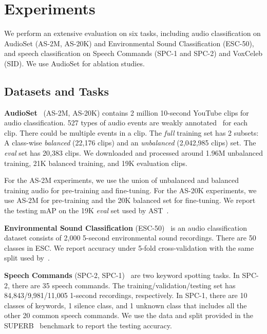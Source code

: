 \documentclass{article}
\begin{document}
\section{Experiments}
We perform an extensive evaluation on six tasks, 
including audio classification on AudioSet (AS-2M, AS-20K) and Environmental Sound Classification (ESC-50), and speech classification on Speech Commands (SPC-1 and SPC-2) and VoxCeleb (SID).
We use AudioSet for ablation studies.

\subsection{Datasets and Tasks\label{sec:exp:dataset}}


\noindent \textbf{AudioSet}~\cite{gemmeke2017audio} (AS-2M, AS-20K) contains 2 million 10-second YouTube clips for audio classification.
527 types of audio events are weakly annotated~\cite{tagging_right,vggish,hershey2021benefit} for each clip. 
There could be multiple events in a clip.
The \emph{full} training set has 2 subsets: A class-wise \emph{balanced} (22,176 clips) and an \emph{unbalanced} (2,042,985 clips) set.
The \emph{eval} set has 20,383 clips. 
We downloaded and processed around 1.96M unbalanced training, 21K balanced training, and 19K evaluation clips. 

For the AS-2M experiments, we use the union of unbalanced and balanced training audio for pre-training and fine-tuning. 
For the AS-20K experiments, we use AS-2M for pre-training and the 20K balanced set for fine-tuning.
We report the testing mAP on the 19K \emph{eval} set used by AST~\cite{gong2021ast}.

\noindent \textbf{Environmental Sound Classification} 
(ESC-50)~\cite{piczak2015dataset} is an audio classification dataset consists of 2,000 5-second environmental sound recordings. There are 50 classes in ESC. We report accuracy under 5-fold cross-validation with the same split used by~\cite{gong2021ast}. 

\noindent \textbf{Speech Commands}
(SPC-2, SPC-1)~\cite{speechcommandsv2} are two keyword spotting tasks.
In SPC-2, there are 35 speech commands. 
The training/validation/testing set has 84,843/9,981/11,005 1-second recordings, respectively.
In SPC-1, there are 10 classes of keywords, 1 silence class, and 1 unknown class that includes all the other 20 common speech commands. We use the data and split provided in the SUPERB~\cite{yang21c_interspeech} benchmark to report the testing accuracy.
\end{document}
